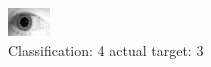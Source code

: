 \begin{figure}[h!]
\begin{center}
\includegraphics[width=0.60\columnwidth]{figures/ID1831_class_4_target_3.png}
\end{center}
\caption{ Classification: 4 actual target: 3}
\label{fig:ID1831_class_4_target_3}
\end{figure}
